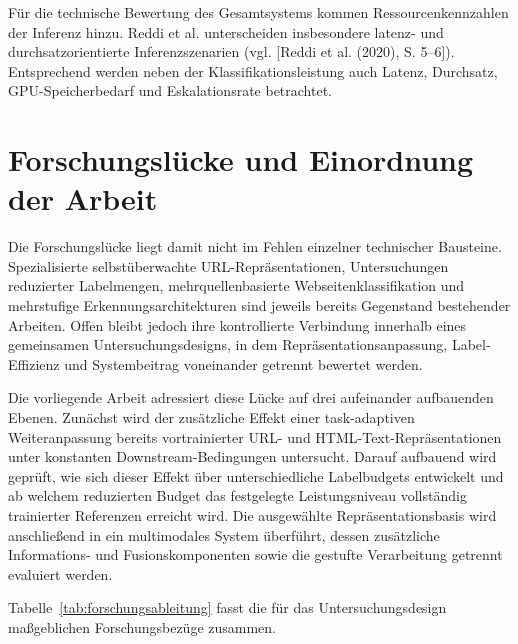 Für die technische Bewertung des Gesamtsystems kommen Ressourcenkennzahlen der
Inferenz hinzu. Reddi et al. unterscheiden insbesondere latenz- und
durchsatzorientierte Inferenzszenarien
(vgl. [Reddi et al. (2020), S. 5--6]). Entsprechend werden neben der
Klassifikationsleistung auch Latenz, Durchsatz, GPU-Speicherbedarf und
Eskalationsrate betrachtet.

\section{Forschungslücke und Einordnung der Arbeit}

Die Forschungslücke liegt damit nicht im Fehlen einzelner technischer Bausteine.
Spezialisierte selbstüberwachte URL-Repräsentationen, Untersuchungen reduzierter
Labelmengen, mehrquellenbasierte Webseitenklassifikation und mehrstufige
Erkennungsarchitekturen sind jeweils bereits Gegenstand bestehender Arbeiten. Offen
bleibt jedoch ihre kontrollierte Verbindung innerhalb eines gemeinsamen
Untersuchungsdesigns, in dem Repräsentationsanpassung, Label-Effizienz und
Systembeitrag voneinander getrennt bewertet werden.

Die vorliegende Arbeit adressiert diese Lücke auf drei aufeinander aufbauenden Ebenen.
Zunächst wird der zusätzliche Effekt einer task-adaptiven Weiteranpassung bereits
vortrainierter URL- und HTML-Text-Repräsentationen unter konstanten
Downstream-Bedingungen untersucht. Darauf aufbauend wird geprüft, wie sich dieser
Effekt über unterschiedliche Labelbudgets entwickelt und ab welchem reduzierten
Budget das festgelegte Leistungsniveau vollständig trainierter Referenzen erreicht wird.
Die ausgewählte Repräsentationsbasis wird anschließend in ein multimodales System
überführt, dessen zusätzliche Informations- und Fusionskomponenten sowie die gestufte
Verarbeitung getrennt evaluiert werden.

Tabelle~\ref{tab:forschungsableitung} fasst die für das Untersuchungsdesign
maßgeblichen Forschungsbezüge zusammen.

